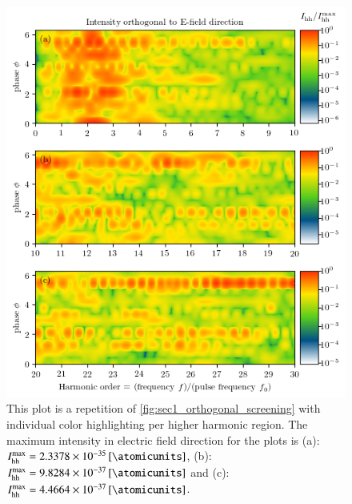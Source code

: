 \documentclass[11pt, a4paper]{scrartcl}
\begin{document}
\begin{figure}[H]
    \centering
    \includegraphics[width=\textwidth]{phase=variable_ortho_split_plot.png}
    \caption{This plot is a repetition of \cref{fig:sec1_orthogonal_screening} with individual color
      highlighting per higher harmonic region. The maximum intensity in electric
      field direction for the plots is (a): $I_{\mathrm{hh}}^{\mathrm{max}} = \SI{2.3378e-35}{[\atomicunits]}$, 
      (b): $I_{\mathrm{hh}}^{\mathrm{max}} = \SI{9.8284e-37}{[\atomicunits]}$ and (c): 
      $I_{\mathrm{hh}}^{\mathrm{max}} = \SI{4.4664e-37}{[\atomicunits]}$.}
    \label{fig:sec1_orthogonal_screening_s}
\end{figure}
\end{document}
